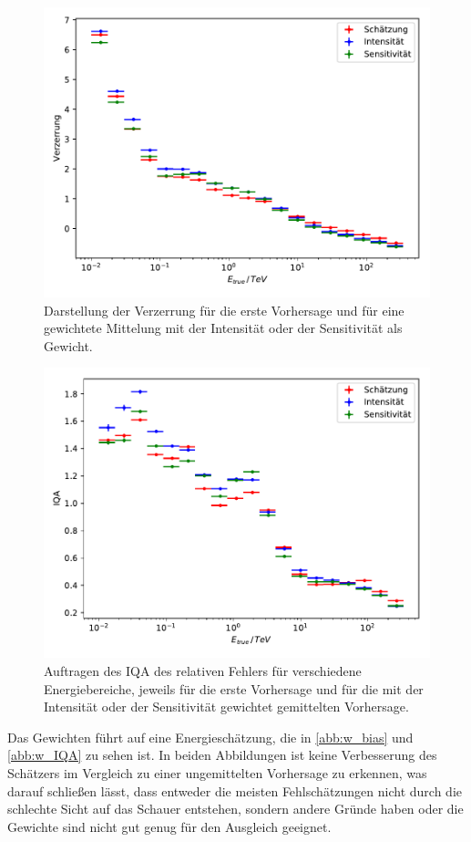 \begin{figure}
  \includegraphics[width=\textwidth]{Plots/RF_weights_bias.pdf}
  \centering
  \caption{Darstellung der Verzerrung für die erste Vorhersage und für eine gewichtete Mittelung mit der Intensität
            oder der Sensitivität als Gewicht.}
  \label{abb:w_bias}
\end{figure}
\begin{figure}
  \includegraphics[width=\textwidth]{Plots/RF_weights_resolution.pdf}
  \centering
  \caption{Auftragen des IQA des relativen Fehlers für verschiedene Energiebereiche, jeweils für die erste Vorhersage und
            für die mit der Intensität oder der Sensitivität gewichtet gemittelten Vorhersage.}
  \label{abb:w_IQA}
\end{figure}
Das Gewichten führt auf eine Energieschätzung, die in \autoref{abb:w_bias} und \autoref{abb:w_IQA} zu sehen ist.
In beiden Abbildungen ist keine Verbesserung des Schätzers im Vergleich zu einer ungemittelten Vorhersage zu erkennen, was darauf schließen lässt,
dass entweder die meisten Fehlschätzungen nicht durch die schlechte Sicht auf das Schauer entstehen, sondern andere Gründe haben oder die
Gewichte sind nicht gut genug für den Ausgleich geeignet.

